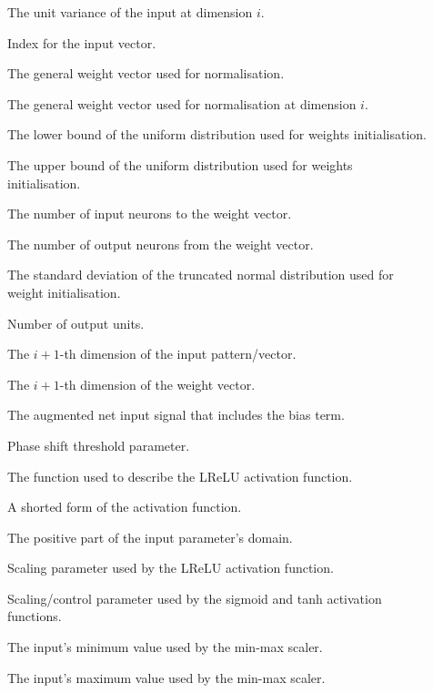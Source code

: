 \begin{description}
	\item [\parbox{1cm}{$\sigma^2_i$}] The unit variance of the input at dimension $i$.
	\item [\parbox{1cm}{$i$}] Index for the input vector.
	\item [\parbox{1cm}{$\omega$}] The general weight vector used for normalisation.
	\item [\parbox{1cm}{$\omega_{i}$}] The general weight vector used for normalisation at dimension $i$.
	\item [\parbox{1cm}{$\omega_{min}$}] The lower bound of the uniform distribution used for weights initialisation.
	\item [\parbox{1cm}{$\omega_{max}$}] The upper bound of the uniform distribution used for weights initialisation.
	\item [\parbox{1cm}{\footnotesize{$fanin$}}] The number of input neurons to the weight vector.
	\item [\parbox{1cm}{\footnotesize{$fanout$}}] The number of output neurons from the weight vector.
	\item [\parbox{1cm}{$\sigma$}] The standard deviation of the truncated normal distribution used for weight initialisation.
	\item [\parbox{1cm}{$K$}] Number of output units.
	\item [\parbox{1cm}{$x_{i+1}$}] The $i+1$-th dimension of the input pattern/vector.
	\item [\parbox{1cm}{$v_{i+1}$}] The $i+1$-th dimension of the weight vector.
	\item [\parbox{1cm}{$net^{'}$}] The augmented net input signal that includes the bias term.
	\item [\parbox{1cm}{$\tau$}] Phase shift threshold parameter.
	\item [\parbox{1cm}{$f(x)$}] The function used to describe the \acs{LReLU} activation function.
	\item [\parbox{1cm}{$f$}] A shorted form of the activation function.
	\item [\parbox{1cm}{$x^{+}$}] The positive part of the input parameter's domain.
	\item [\parbox{1cm}{$\alpha$}] Scaling parameter used by the \acs{LReLU} activation function.
	\item [\parbox{1cm}{$\lambda$}] Scaling/control parameter used by the sigmoid and tanh activation functions.
	\item [\parbox{1cm}{$x_{min}$}] The input's minimum value used by the min-max scaler.
	\item [\parbox{1cm}{$x_{max}$}] The input's maximum value used by the min-max scaler.

\end{description}
